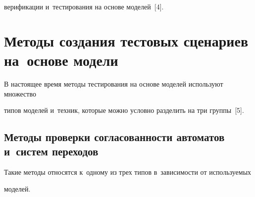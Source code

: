 верификации и~тестирования на основе моделей~[4].





                  \vspace*{-6pt}





\section{Методы создания тестовых сценариев на~основе модели}





   В настоящее время методы тестирования на основе моделей используют множество


типов моделей и~техник, которые можно условно разделить на три группы~[5].





                  \vspace*{-6pt}





   \subsection{Методы проверки согласованности автоматов и~систем переходов}





   Такие методы относятся к~одному из трех типов в~зависимости от использу\-емых


моделей.


